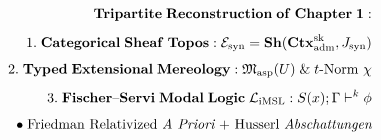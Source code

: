 \documentclass[preview]{standalone}
\begin{document}
\begin{align*}
\special{dvisvgm:raw <g id='unique000'>}\mathbf{Tripartite\;Reconstruction\;of\;Chapter\;1:}\\[4pt]1.\;\mathbf{Categorical\;Sheaf\;Topos:}\;\mathcal{E}_{\text{syn}} = \mathbf{Sh}(\mathbf{Ctx}_{\text{adm}}^{\text{sk}}, J_{\text{syn}})\\[4pt]2.\;\mathbf{Typed\;Extensional\;Mereology:}\;\mathfrak{M}_{\text{asp}}(U)\;\&\;t\text{-Norm }\chi\\[4pt]3.\;\mathbf{Fischer\text{--}Servi\;Modal\;Logic\;\mathcal{L}_{\text{iMSL}}:}\;S(x);\Gamma\vdash^k\phi\\[4pt]\bullet\;\text{Friedman Relativized }\textit{A Priori}\text{ + Husserl }\textit{Abschattungen}\special{dvisvgm:raw </g>}
\end{align*}
\end{document}
